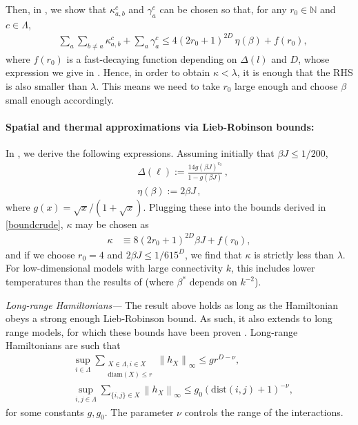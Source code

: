 \documentclass[aps,pra,amsmath,amssymb,twocolumn,10pt]{revtex4-2}
\theoremstyle{definition}
\newcommand{\norm}[1]{\left\|#1\right\|}
\begin{document}
 Then, in \cite{supplemental}, we show that $\kappa_{a,b}^c$ and $\gamma_a^c$ can be chosen so that, for any $r_0\in\mathbb{N}$ and $c\in\Lambda$, 
 \begin{align}
&\sum_a\sum_{b\ne a}\kappa_{a,b}^c+\sum_a \gamma_a^c \le 4(2r_0+1)^{2D}\,\eta(\beta)\label{boundcrude}+f(r_0),
\end{align}
where $f(r_0)$ is a fast-decaying function depending on $\Delta(l)$ and $D$, whose expression we give in \cite{supplemental}.
Hence, in order to obtain $\kappa < \lambda$, it is enough that the RHS is also smaller than $\lambda$. This means we need to take $r_0$ large enough and choose $\beta$ small enough accordingly. 


\paragraph{Spatial and thermal approximations via Lieb-Robinson bounds:} In \cite{supplemental}, we derive the following expressions. Assuming initially that $\beta J\le 1/200$,
\begin{align*}
&\Delta(\ell):= \frac{14 g(\beta J)^{r_0}}{1-g(\beta J)}\,,\\
  &  \eta(\beta) := 2 \beta J \,,
\end{align*}
where $g(x)=\sqrt{x}/(1+\sqrt{x})$.
Plugging these into the bounds derived in \eqref{boundcrude}, $\kappa$ may be chosen as
\begin{align*}
\kappa& \equiv 8(2 r_0+1)^{2D} \beta J +f(r_0),
\end{align*}
and if we choose $r_0=4$ and $2 \beta J\le 1/615^D$, we find that $\kappa$ is strictly less than $\lambda$. For low-dimensional models with large connectivity $k$, this includes lower temperatures than the results of \cite{tang_efficient} (where $\beta^*$ depends on $k^{-2}$).

\emph{Long-range Hamiltonians—} The result above holds as long as the Hamiltonian obeys a strong enough Lieb-Robinson bound. As such, it also extends to long range models, for which these bounds have been proven \cite{Kuwahara2019LongRange,TranLR2021}. Long-range Hamiltonians are such that
\begin{align}
 &  \sup_{i \in \Lambda} \sum_{\substack{X \in \Lambda, i \in X \\ \text{diam}(X)\le r}} \norm{h_{X}}_{\infty} \le g r^{D-\nu}, \\
 &   \sup_{i,j \in \Lambda} \sum_{\{i,j \} \in X} \norm{h_{X}}_{\infty} \le g_0 (\text{dist}(i,j)+1)^{-\nu},
\end{align}
for some constants $g,g_0$. The parameter $\nu$ controls the range of the interactions.
\end{document}
